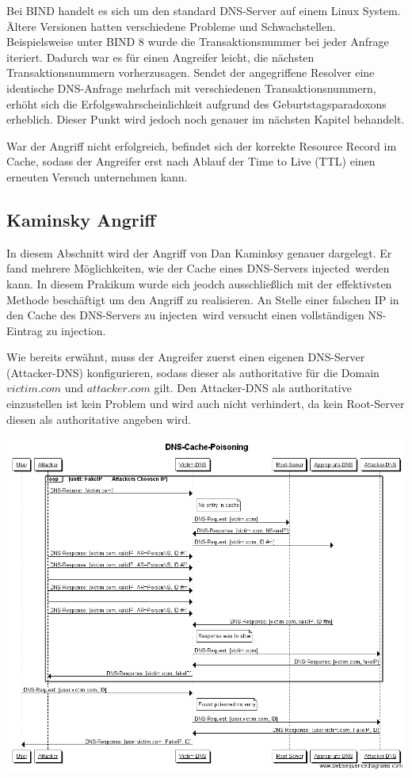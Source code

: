 \documentclass[10pt,a4paper]{article}
\begin{document}
Bei BIND handelt es sich um den standard DNS-Server auf einem Linux System. Ältere Versionen hatten verschiedene Probleme und Schwachstellen. Beispielsweise unter BIND 8 wurde die Transaktionsnummer bei jeder Anfrage iteriert. Dadurch war es für einen Angreifer leicht, die nächsten Transaktionsnummern vorherzusagen. Sendet der angegriffene Resolver eine identische DNS-Anfrage mehrfach mit verschiedenen Transaktionsnummern, erhöht sich die Erfolgswahrscheinlichkeit aufgrund des Geburtstagsparadoxons erheblich. Dieser Punkt wird jedoch noch genauer im nächsten Kapitel behandelt.

War der Angriff nicht erfolgreich, befindet sich der korrekte Resource Record im Cache, sodass der Angreifer erst nach Ablauf der Time to Live (TTL) einen erneuten Versuch unternehmen kann.

\subsection{Kaminsky Angriff}
In diesem Abschnitt wird der Angriff von Dan Kaminksy genauer dargelegt. Er fand mehrere Möglichkeiten, wie der Cache eines DNS-Servers \glqq injected\grqq\ werden kann. In diesem Prakikum wurde sich jeodch ausschließlich mit der effektivsten Methode beschäftigt um den Angriff zu realisieren. An Stelle einer falschen IP in den Cache des DNS-Servers zu \glqq injecten\grqq\ wird versucht einen vollständigen NS-Eintrag zu injection.  

Wie bereits erwähnt, muss der Angreifer zuerst einen eigenen DNS-Server (Attacker-DNS) konfigurieren, sodass dieser als authoritative für die Domain $victim.com$ und $attacker.com$ gilt. Den Attacker-DNS als authoritative einzustellen ist kein Problem und wird auch nicht verhindert, da kein Root-Server diesen als authoritative angeben wird.

{
\centering
\includegraphics[scale=0.45]{DNS-Cache-Poisoning.png}
\newpage
}
\end{document}
